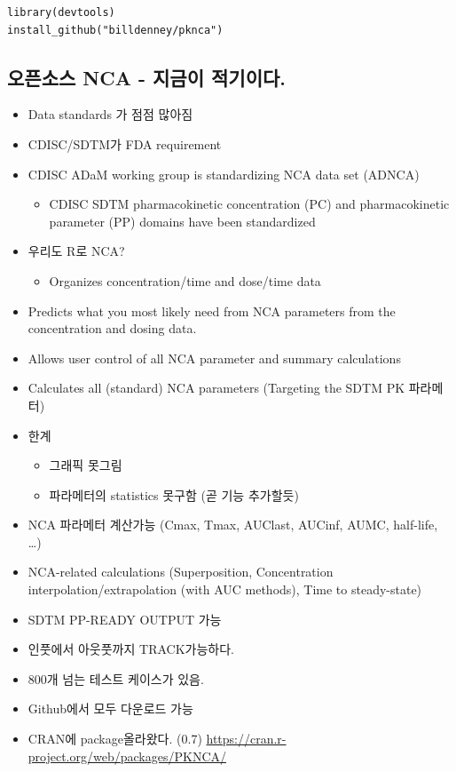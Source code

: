 \documentclass[
  12pt,
]{krantz}
\providecommand{\tightlist}{%
  \setlength{\itemsep}{0pt}\setlength{\parskip}{0pt}}
\begin{document}
\begin{verbatim}
library(devtools)
install_github("billdenney/pknca")
\end{verbatim}

\hypertarget{opennca}{%
\subsection{오픈소스 NCA - 지금이 적기이다.}\label{opennca}}

\begin{itemize}
\tightlist
\item
  Data standards 가 점점 많아짐
\item
  CDISC/SDTM가 FDA requirement
\item
  CDISC ADaM working group is standardizing NCA data set (ADNCA) \textbar{}

  \begin{itemize}
  \tightlist
  \item
    CDISC SDTM pharmacokinetic concentration (PC) and pharmacokinetic parameter (PP) domains have been standardized
  \end{itemize}
\item
  우리도 R로 NCA?

  \begin{itemize}
  \tightlist
  \item
    Organizes concentration/time and dose/time data
  \end{itemize}
\item
  Predicts what you most likely need from NCA parameters from the concentration and dosing data.
\item
  Allows user control of all NCA parameter and summary calculations
\item
  Calculates all (standard) NCA parameters (Targeting the SDTM PK 파라메터)
\item
  한계

  \begin{itemize}
  \tightlist
  \item
    그래픽 못그림
  \item
    파라메터의 statistics 못구함 (곧 기능 추가할듯)
  \end{itemize}
\item
  NCA 파라메터 계산가능 (Cmax, Tmax, AUClast, AUCinf, AUMC, half-life, \ldots)
\item
  NCA-related calculations (Superposition, Concentration interpolation/extrapolation (with AUC methods), Time to steady-state)
\item
  SDTM PP-READY OUTPUT 가능
\item
  인풋에서 아웃풋까지 TRACK가능하다.
\item
  800개 넘는 테스트 케이스가 있음.
\item
  Github에서 모두 다운로드 가능
\item
  CRAN에 package올라왔다. (0.7) \url{https://cran.r-project.org/web/packages/PKNCA/}


\end{itemize}
\end{document}
